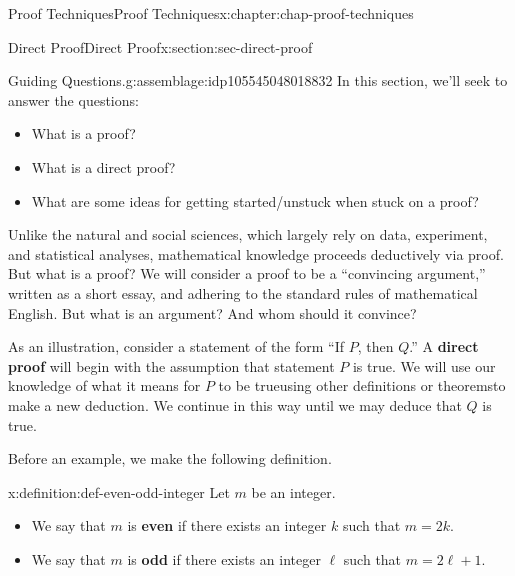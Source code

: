 \documentclass[oneside,10pt,]{book}
\newcommand{\terminology}[1]{\textbf{#1}}
\begin{document}
\begin{chapterptx}{Proof Techniques}{}{Proof Techniques}{}{}{x:chapter:chap-proof-techniques}
%
%
\typeout{************************************************}
\typeout{************************************************}
%
\begin{sectionptx}{Direct Proof}{}{Direct Proof}{}{}{x:section:sec-direct-proof}
\begin{assemblage}{Guiding Questions.}{g:assemblage:idp105545048018832}%
In this section, we'll seek to answer the questions: %
\begin{itemize}[label=\textbullet]
\item{}What is a proof?%
\item{}What is a direct proof?%
\item{}What are some ideas for getting started\slash{}unstuck when stuck on a proof?%
\end{itemize}
%
\end{assemblage}
\begin{introduction}{}%
Unlike the natural and social sciences, which largely rely on data, experiment, and statistical analyses, mathematical knowledge proceeds deductively via proof. But what is a proof? We will consider a proof to be a ``convincing argument,'' written as a short essay, and adhering to the standard rules of mathematical English. But what is an argument? And whom should it convince?%
\par
As an illustration, consider a statement of the form ``If \(P\), then \(Q\).'' A \terminology{direct proof} will begin with the assumption that statement \(P\) is true. We will use our knowledge of what it means for \(P\) to be true\textemdash{}using other definitions or theorems\textemdash{}to make a new deduction. We continue in this way until we may deduce that \(Q\) is true.%
\end{introduction}%
Before an example, we make the following definition.%
\begin{definition}{}{x:definition:def-even-odd-integer}%
%
%
%
%
Let \(m\) be an integer.%
%
\begin{itemize}[label=\textbullet]
\item{}We say that \(m\) is \terminology{even} if there exists an integer \(k\) such that \(m = 2k\).%
\item{}We say that \(m\) is \terminology{odd} if there exists an integer \(\ell\) such that \(m = 2\ell + 1\).%

\end{itemize}
\end{definition}
\end{sectionptx}
\end{chapterptx}
\end{document}
